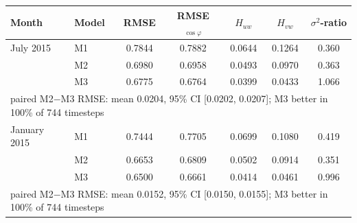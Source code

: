 \begin{tabular}{llccccc}
\toprule
Month & Model & RMSE & RMSE$_{\cos\varphi}$ & $H_{uw}$ & $H_{vw}$ & $\sigma^2$-ratio \\
\midrule
July 2015 & M1 & 0.7844 & 0.7882 & 0.0644 & 0.1264 & 0.360 \\
 & M2 & 0.6980 & 0.6958 & 0.0493 & 0.0970 & 0.363 \\
 & M3 & 0.6775 & 0.6764 & 0.0399 & 0.0433 & 1.066 \\
\multicolumn{7}{l}{\quad\footnotesize paired M2$-$M3 RMSE: mean 0.0204, 95\% CI [0.0202, 0.0207]; M3 better in 100\% of 744 timesteps} \\[2pt]
January 2015 & M1 & 0.7444 & 0.7705 & 0.0699 & 0.1080 & 0.419 \\
 & M2 & 0.6653 & 0.6809 & 0.0502 & 0.0914 & 0.351 \\
 & M3 & 0.6500 & 0.6661 & 0.0414 & 0.0461 & 0.996 \\
\multicolumn{7}{l}{\quad\footnotesize paired M2$-$M3 RMSE: mean 0.0152, 95\% CI [0.0150, 0.0155]; M3 better in 100\% of 744 timesteps} \\[2pt]
\bottomrule
\end{tabular}
